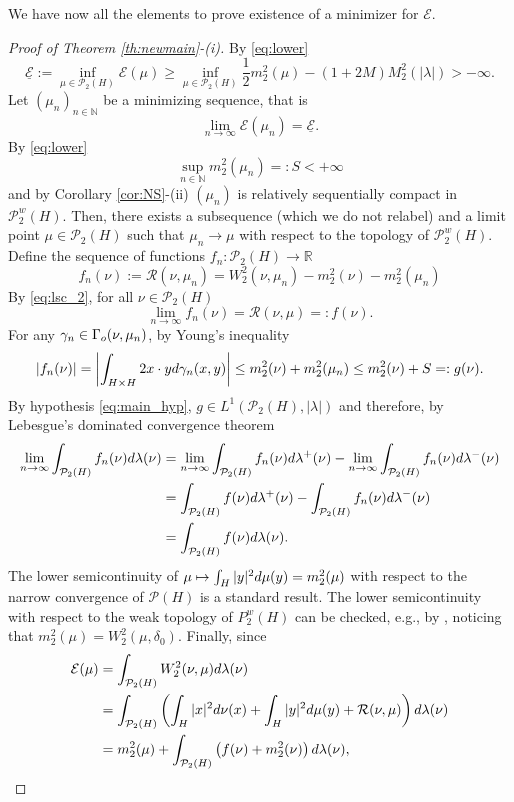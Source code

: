 \documentclass[12pt,a4paper]{article}
\newcommand{\N}{\mathbb{N}}
\newcommand{\R}{\mathbb{R}}
\renewcommand{\P}{\mathcal{P}}
\renewcommand{\d}{{\rm d}}
\newcommand{\X}{\mathcal{P}_2(H)}
\theoremstyle{plain}
\theoremstyle{definition}
\begin{document}
We have now all the elements to prove existence of a minimizer for $\mathscr{E}$.
\begin{proof}[Proof of Theorem \ref{th:newmain}-(i)]
By \eqref{eq:lower}
\[
	\underline{\mathcal{E}}:=\inf_{\mu \in \X} \mathcal E(\mu) \geq \inf_{\mu \in \X} \frac 12 m_2^2(\mu) - (1+2M)M_2^2(|\lambda|) >-\infty.
\]	
Let $(\mu_n)_{n\in \N}$ be a minimizing sequence, that is
\[
	\lim_{n \to \infty} \mathcal{E}(\mu_n)=\underline{\mathcal E}.
\]
By \eqref{eq:lower}
\[
	\sup_{n\in \N}m_2^2(\mu_n) =:S<+\infty
\]
and by Corollary \ref{cor:NS}-(ii) $(\mu_n)$ is relatively sequentially compact in $\P_2^w(H)$. Then, there exists a subsequence (which we do not relabel) and a limit point $\mu\in \X$ such that $\mu_n \to \mu$ with respect to the topology of $\P_2^w(H)$. Define the sequence of functions $f_n:\X \to \R$
\[
	f_n(\nu):=\mathcal R(\nu,\mu_n) = W_2^2(\nu,\mu_n)-m_2^2(\nu)-m_2^2(\mu_n)
\]
By \eqref{eq:lsc_2}, for all $\nu \in \X$
\[
	\lim_{n \to \infty} f_n(\nu) = \mathcal R(\nu,\mu) =:f(\nu).
\]	
For any $\gamma_n\in \Gamma_{\rm o}(\nu,\mu_n)$, by Young's inequality
\[
	|f_n(\nu)|=\left| \int_{H \times H}2x\cdot y\d\gamma_n(x,y)\right|\leq m_2^2(\nu)+m_2^2(\mu_n) \leq m_2^2(\nu) +S=:g(\nu).
\]
By hypothesis \eqref{eq:main_hyp}, $g\in L^1(\X,|\lambda|)$ and therefore, by Lebesgue's dominated convergence theorem
\begin{align}
	\lim_{n\to \infty} \int_{\X}f_n(\nu)\d\lambda(\nu) &=  \lim_{n\to \infty} \int_{\X}f_n(\nu)\d\lambda^+(\nu) - \lim_{n\to \infty} \int_{\X}f_n(\nu)\d\lambda^-(\nu)  \nonumber\\
		&=   \int_{\X}f(\nu)\d\lambda^+(\nu) - \int_{\X}f_n(\nu)\d\lambda^-(\nu)  \nonumber\\
		&= \int_{\X} f(\nu)\d\lambda(\nu).\label{eq:cont}
\end{align} 
The lower semicontinuity of $\mu \mapsto \int_H|y|^2\d\mu(y)=m_2^2(\mu)$ with respect to the narrow convergence of $\P(H)$ is a standard result. The lower semicontinuity with respect to the weak topology of $P_2^w(H)$ can be checked, e.g., by \cite[Theorem 5.1]{naldi-savare}, noticing that $m_2^2(\mu)=W_2^2(\mu,\delta_0)$. Finally, since
\begin{align*}
	\mathcal{E}(\mu) &= \int_{\X} W_2^2(\nu,\mu)\d\lambda(\nu)\\
		&= \int_{\X} \left( \int_H|x|^2\d\nu(x) + \int_H|y|^2\d\mu(y)+\mathcal{R}(\nu,\mu)\right)\d\lambda(\nu)\\
		&= m_2^2(\mu) +\int_{\X} \left(f(\nu) + m_2^2(\nu) \right)\d\lambda(\nu),
\end{align*}

\end{proof}
\end{document}
